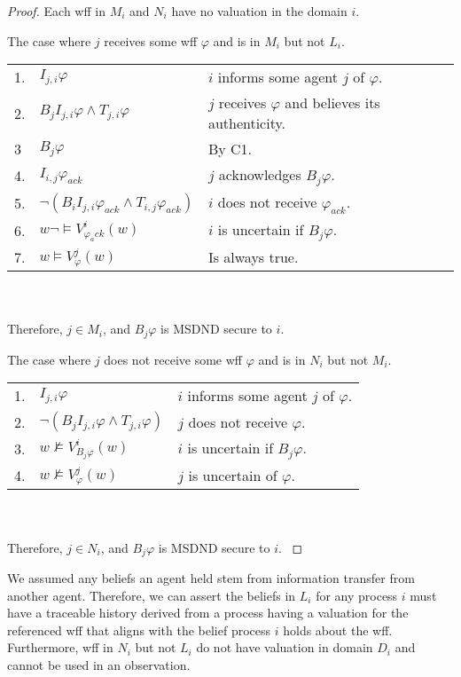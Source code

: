 \begin{proof}
Each wff in $M_i$ and $N_i$ have no valuation in the domain $i$.

\begin{case}
The case where $j$ receives some wff $\varphi$ and is in $M_i$ but not $L_i$.
\end{case}

\begin{table}[H]
\centering
\small
\begin{tabularx}{\linewidth}{l l X}
1. & $I_{j,i} \varphi$ & $i$ informs some agent $j$ of $\varphi$. \\
2. & $B_{j}I_{j,i} \varphi \wedge T_{j,i} \varphi$ & $j$ receives $\varphi$ and believes its authenticity. \\
3  & $B_j \varphi$ & By C1. \\
4. & $I_{i,j} \varphi_{ack}$ & $j$ acknowledges $B_j \varphi$. \\
5. & $\neg(B_{i}I_{j,i} \varphi_{ack} \wedge T_{i,j} \varphi_{ack})$ & $i$ does not receive $\varphi_{ack}$. \\
6. & $w \neg \vDash V_{\varphi_ack}^{i}(w)$ & $i$ is uncertain if $B_j \varphi$. \\
7. & $w \vDash V_{\varphi}^{j}(w)$ & Is always true. %
\end{tabularx} \\~\\
Therefore, $j \in M_i$, and $B_j \varphi$ is MSDND secure to $i$.
\label{tab:msetsecurity}
\end{table}

\begin{case}
The case where $j$ does not receive some wff $\varphi$ and is in $N_i$ but not $M_i$.
\end{case}

\begin{table}[H]
\centering
\small
\begin{tabularx}{\linewidth}{l l X}
1. & $I_{j,i} \varphi$ & $i$ informs some agent $j$ of $\varphi$. \\
2. & $\neg(B_{j}I_{j,i} \varphi \wedge T_{j,i} \varphi)$ & $j$ does not receive $\varphi$. \\
3. & $w \not \vDash V_{B_j \varphi}^{i}(w)$ & $i$ is uncertain if $B_j \varphi$. \\
4. & $w \not \vDash V_{\varphi}^{j}(w)$ & $j$ is uncertain of $\varphi$. %
\end{tabularx} \\~\\
Therefore, $j \in N_i$, and $B_j \varphi$ is MSDND secure to $i$.
\label{tab:nsetsecurity}
\end{table}
\end{proof}

We assumed any beliefs an agent held stem from information transfer from another agent.
Therefore, we can assert the beliefs in $L_i$ for any process $i$ must have a traceable history derived from a process having a valuation for the referenced wff that aligns with the belief process $i$ holds about the wff.
Furthermore, wff in $N_i$ but not $L_i$ do not have valuation in domain $D_i$ and cannot be used in an observation.
